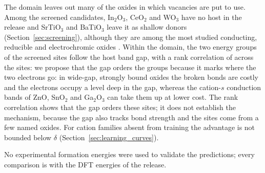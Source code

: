 The domain leaves out many of the oxides in which vacancies are put to use. Among the screened candidates, In$_2$O$_3$, CeO$_2$ and WO$_3$ have no host in the release and SrTiO$_3$ and BaTiO$_3$ leave it as shallow donors (Section~\ref{sec:screening}), although they are among the most studied conducting, reducible and electrochromic oxides \citep{Ellmer2012past,Esch2005electron,Granqvist2000electrochromic}. Within the domain, the two energy groups of the screened sites follow the host band gap, with a rank correlation of \numScreeningDemoDescriptiveSpearmanDftVsBandGap{} across the \numNetScreenSites{} sites: we propose that the gap orders the groups because it marks where the two electrons go: in wide-gap, strongly bound oxides the broken bonds are costly and the electrons occupy a level deep in the gap, whereas the cation-$s$ conduction bands of ZnO, SnO$_2$ and Ga$_2$O$_3$ can take them up at lower cost. The rank correlation shows that the gap orders these sites; it does not establish the mechanism, because the gap also tracks bond strength and the sites come from a few named oxides. For cation families absent from training the advantage is not bounded below $\delta$ (Section~\ref{sec:learning_curves}).

No experimental formation energies were used to validate the predictions; every comparison is with the DFT energies of the release.
